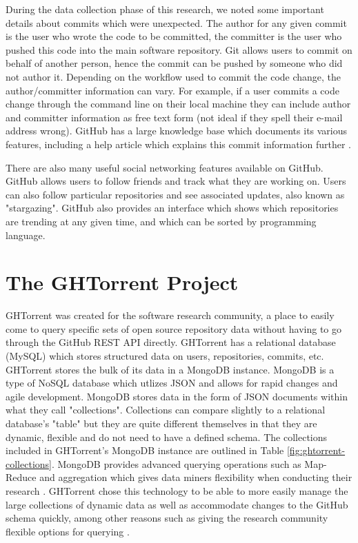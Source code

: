 During the data collection phase of this research, we noted some important details about commits which were unexpected. The author for any given commit is the user who wrote the code to be committed, the committer is the user who pushed this code into the main software repository. Git allows users to commit on behalf of another person, hence the commit can be pushed by someone who did not author it. Depending on the workflow used to commit the code change, the author/committer information can vary. For example, if a user commits a code change through the command line on their local machine they can include author and committer information as free text form (not ideal if they spell their e-mail address wrong). GitHub has a large knowledge base which documents its various features, including a help article which explains this commit information further \cite{_why_????}.

There are also many useful social networking features available on GitHub. GitHub allows users to follow friends and track what they are working on. Users can also follow particular repositories and see associated updates, also known as "stargazing". GitHub also provides an interface which shows which repositories are trending at any given time, and which can be sorted by programming language.

\section{The GHTorrent Project}
\label{sec-GHTorrentProject}
GHTorrent was created for the software research community, a place to easily come to query specific sets of open source repository data without having to go through the GitHub REST API directly. GHTorrent has a relational database (MySQL) which stores structured data on users, repositories, commits, etc. GHTorrent stores the bulk of its data in a MongoDB instance. MongoDB is a type of NoSQL database which utlizes JSON and allows for rapid changes and agile development. MongoDB stores data in the form of JSON documents within what they call "collections". Collections can compare slightly to a relational database's "table" but they are quite different themselves in that they are dynamic, flexible and do not need to have a defined schema. The collections included in GHTorrent's MongoDB instance are outlined in Table \ref{fig:ghtorrent-collections}. MongoDB provides advanced querying operations such as Map-Reduce and aggregation which gives data miners flexibility when conducting their research \cite{_mongodb_????}. GHTorrent chose this technology to be able to more easily manage the large collections of dynamic data as well as accommodate changes to the GitHub schema quickly, among other reasons such as giving the research community flexible options for querying \cite{gousios_ghtorrent:_2012}. 

